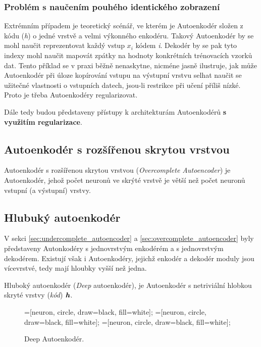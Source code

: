 \subsubsection{Problém s naučením pouhého identického zobrazení}
\label{sec:identity}
Extrémním případem je teoretický scénář, ve kterém je Autoenkodér složen z kódu (\emph{h}) o jedné vrstvě a velmi výkonného enkodéru.
Takový Autoenkodér by se mohl naučit reprezentovat každý vstup $x_i$ kódem \emph{i}.
Dekodér by se pak tyto indexy mohl naučit mapovát zpátky na hodnoty konkrétních trénovacích vzorků dat.
Tento příklad se v praxi běžně nenaskytne, nicméne jasně ilustruje,
jak může Autoenkodér při úloze kopírování vstupu na výstupní vrstvu selhat naučit se užitečné vlastnosti o vstupních datech, jsou-li restrikce při učení příliš nízké.
Proto je třeba Autoenkodéry regularizovat.

Dále tedy budou představeny přístupy k architekturám Autoenkodérů \textbf{s využitím regularizace}.
\subsection{Autoenkodér s rozšířenou skrytou vrstvou}
\label{sec:overcomplete_autoencoder}
Autoenkodér s rozšířenou skrytou vrstvou (\emph{Overcomplete Autoencoder}) je Autoenkodér, jehož počet neuronů ve skrýté vrstvě je větší než počet neuronů vstupní (a výstupní) vrstvy.

\subsection{Hlubuký autoenkodér}
V sekci \autoref{sec:undercomplete_autoencoder} a \autoref{sec:overcomplete_autoencoder} byly představeny Autonkodéry s jednovrstvým enkodérém a s jednovrstvým dekodérem.
Existují však i Autoenkodéry, jejichž enkodér a dekodér moduly jsou vícevrstvé, tedy mají hloubky vyšší než jedna.

Hluboký autoenkodér (\emph{Deep} autoenkodér), je Autoenkodér s netriviální hlobkou skryté vrstvy (\emph{kód}) $\textbf{\emph{h}}$.

\begin{figure}[H]
    \centering
    \begin{neuralnetwork}[height=6]
        =[neuron, circle, draw=black, fill=white];
        =[neuron, circle, draw=black, fill=white];
        =[neuron, circle, draw=black, fill=white];
      
        \hiddenlayer[count=4, bias=false]
        \linklayers
        \hiddenlayer[count=2, bias=false]
        \linklayers
        \hiddenlayer[count=4, bias=false]
        \linklayers
        \outputlayer[count=6, text=\xout]
        \linklayers
      \end{neuralnetwork}
    \caption{Deep Autoenkodér.}
    \label{fig:stacked_autoencoder}
\end{figure}

